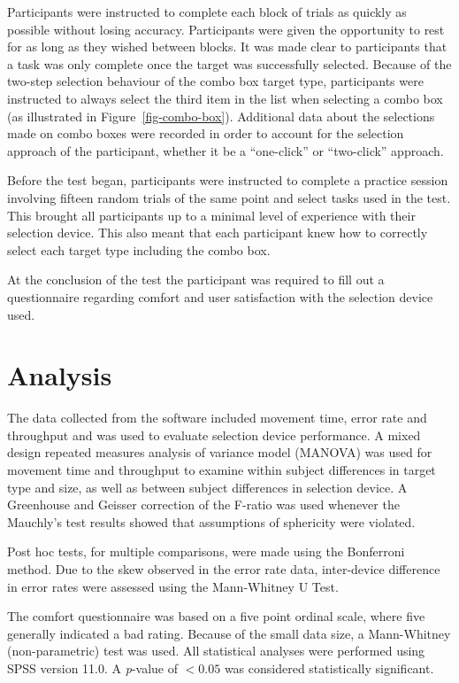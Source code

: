 \documentclass{elsart}
\begin{document}
Participants were instructed to complete each block of trials as quickly
as possible without losing accuracy. Participants were given the
opportunity to rest for as long as they wished between blocks. It was
made clear to participants that a task was only complete once the target
was successfully selected. Because of the two-step selection behaviour
of the combo box target type, participants were instructed to always
select the third item in the list when selecting a combo box (as
illustrated in Figure~\ref{fig-combo-box}). Additional data about the
selections made on combo boxes were recorded in order to account for the
selection approach of the participant, whether it be a ``one-click'' or
``two-click'' approach.

Before the test began, participants were instructed to complete a
practice session involving fifteen random trials of the same point and
select tasks used in the test. This brought all participants up to a
minimal level of experience with their selection device. This also meant
that each participant knew how to correctly select each target type
including the combo box.

At the conclusion of the test the participant was required to fill out a
questionnaire regarding comfort and user satisfaction with the selection
device used.


\section{Analysis}
\label{sec-analysis}

The data collected from the software included movement time, error rate
and throughput and was used to evaluate selection device performance. A
mixed design repeated measures analysis of variance model (MANOVA) was
used for movement time and throughput to examine within subject
differences in target type and size, as well as between subject
differences in selection device. A Greenhouse and Geisser correction of
the F-ratio was used whenever the Mauchly's test results showed that
assumptions of sphericity were violated.

Post hoc tests, for multiple comparisons, were made using the Bonferroni
method. Due to the skew observed in the error rate data, inter-device
difference in error rates were assessed using the Mann-Whitney U Test.

The comfort questionnaire was based on a five point ordinal scale, where
five generally indicated a bad rating. Because of the small data size, a
Mann-Whitney (non-parametric) test was used. All statistical analyses
were performed using SPSS version 11.0. A \emph{p}-value of \(< 0.05\)
was considered statistically significant.
\end{document}
